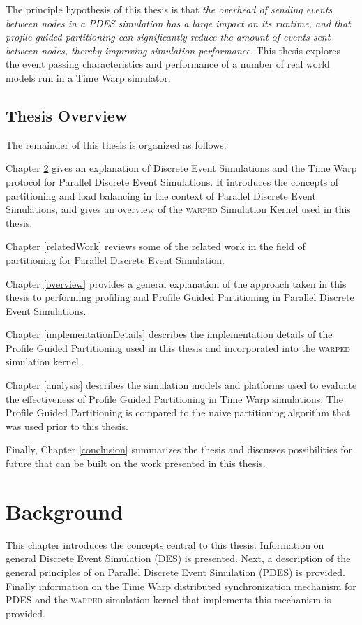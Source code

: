 \documentclass[11pt]{book}
\begin{document}
The principle hypothesis of this thesis is that \emph{the overhead of sending events between nodes in a PDES simulation has a large impact on its runtime, and that profile guided partitioning can significantly reduce the amount of events sent between nodes, thereby improving simulation performance}. This thesis explores the event passing characteristics and performance of a number of real world models run in a Time Warp simulator.

\section{Thesis Overview}

The remainder of this thesis is organized as follows:

Chapter \ref{background} gives an explanation of Discrete Event Simulations and the Time Warp protocol for Parallel Discrete Event Simulations. It introduces the concepts of partitioning and load balancing in the context of Parallel Discrete Event Simulations, and gives an overview of the \textsc{warped} Simulation Kernel used in this thesis.

Chapter \ref{relatedWork} reviews some of the related work in the field of partitioning for Parallel Discrete Event Simulation.

Chapter \ref{overview} provides a general explanation of the approach taken in this thesis to performing profiling and Profile Guided Partitioning in Parallel Discrete Event Simulations.

Chapter \ref{implementationDetails} describes the implementation details of the Profile Guided Partitioning used in this thesis and incorporated into the \textsc{warped} simulation kernel.

Chapter \ref{analysis} describes the simulation models and platforms used to evaluate the effectiveness of Profile Guided Partitioning in Time Warp simulations. The Profile Guided Partitioning is compared to the naive partitioning algorithm that was used prior to this thesis.

Finally, Chapter \ref{conclusion} summarizes the thesis and discusses possibilities for future that can be built on the work presented in this thesis.

\chapter{Background}\label{background}

This chapter introduces the concepts central to this thesis. Information on general Discrete Event Simulation (DES) is presented. Next, a description of the general principles of on Parallel Discrete Event Simulation (PDES) is provided. Finally information on the Time Warp distributed synchronization mechanism for PDES and the \textsc{warped} simulation kernel that implements this mechanism is provided.
\end{document}
